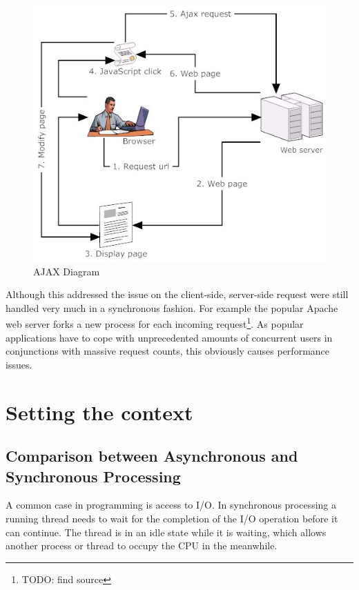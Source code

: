 \begin{figure}[hbtp]
\centering
\includegraphics[scale=0.5]{img/ajax-diagram}
\caption{AJAX Diagram\label{img_ajax}}
\end{figure}

Although this addressed the issue on the client-side, server-side request were
still handled very much in a synchronous fashion. For example the popular Apache
web server forks a new process for each incoming request\footnote{TODO: find
source}. As popular applications have to cope with unprecedented amounts of
concurrent users in conjunctions with massive request counts, this obviously
causes performance issues.\\




\newpage
\section{Setting the context}
\label{setting_the_context}

\subsection{Comparison between Asynchronous and Synchronous Processing}
\label{comparison}

A common case in programming is access to I/O.
In synchronous processing a running thread needs to wait for the completion of
the I/O operation before it can continue.
The thread is in an idle state while it is waiting, which allows another process 
or thread to occupy the CPU in the meanwhile.\\

